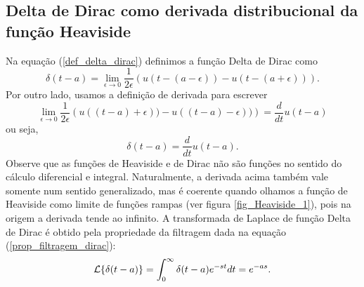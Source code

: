 \documentclass[a4paper,10pt]{book}
\begin{document}
 \subsection{Delta de Dirac como derivada distribucional da função Heaviside}
 Na equação (\ref{def_delta_dirac}) definimos a função Delta de Dirac como
 \begin{equation}
 \delta(t-a)=\lim_{\epsilon\to 0}\frac{1}{2\epsilon}\left(u(t-(a-\epsilon))-u(t-(a+\epsilon))\right).
 \end{equation}
 Por outro lado, usamos a definição de derivada para escrever
 \begin{equation}
 \lim_{\epsilon\to 0}\frac{1}{2\epsilon}\left(u((t-a)+\epsilon))-u((t-a)-\epsilon))\right)=\frac{d}{dt}u(t-a)
 \end{equation}
 ou seja,
 \begin{equation}
 \delta(t-a)=\frac{d}{dt}u(t-a).
 \end{equation}
 Observe que as funções de Heaviside e de Dirac não são funções no sentido do cálculo diferencial e integral. Naturalmente, a derivada acima também vale somente num sentido generalizado, mas é coerente quando olhamos a função de Heaviside como limite de funções rampas (ver figura \ref{fig_Heaviside_1}), pois na origem a derivada tende ao infinito.
 A transformada de Laplace de função Delta de Dirac é obtido pela propriedade da filtragem dada na equação (\ref{prop_filtragem_dirac}):
 \begin{equation}{\label{prop_trans_delta_dirac}}
 \mathcal{L}\{\delta(t-a)\}=\int_0^\infty \delta(t-a)e^{-st}dt=e^{-as}.
 \end{equation}

 
 
\end{document}
